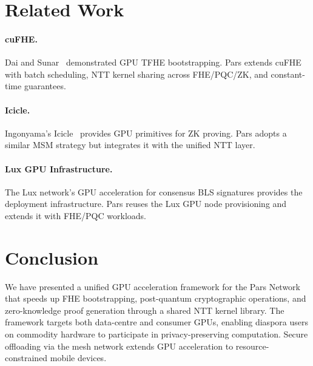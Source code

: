\documentclass[11pt,a4paper]{article}
\begin{document}
\section{Related Work}
\label{sec:related}

\paragraph{cuFHE.}  Dai and Sunar~\cite{dai2018cufhe} demonstrated GPU
TFHE bootstrapping.  Pars extends cuFHE with batch scheduling, NTT
kernel sharing across FHE/PQC/ZK, and constant-time guarantees.

\paragraph{Icicle.}  Ingonyama's Icicle~\cite{icicle2023} provides GPU
primitives for ZK proving.  Pars adopts a similar MSM strategy but
integrates it with the unified NTT layer.

\paragraph{Lux GPU Infrastructure.}  The Lux network's GPU acceleration
for consensus BLS signatures provides the deployment infrastructure.
Pars reuses the Lux GPU node provisioning and extends it with
FHE/PQC workloads.

\section{Conclusion}
\label{sec:conclusion}

We have presented a unified GPU acceleration framework for the Pars
Network that speeds up FHE bootstrapping, post-quantum cryptographic
operations, and zero-knowledge proof generation through a shared NTT
kernel library.  The framework targets both data-centre and consumer
GPUs, enabling diaspora users on commodity hardware to participate in
privacy-preserving computation.  Secure offloading via the mesh network
extends GPU acceleration to resource-constrained mobile devices.
\end{document}
